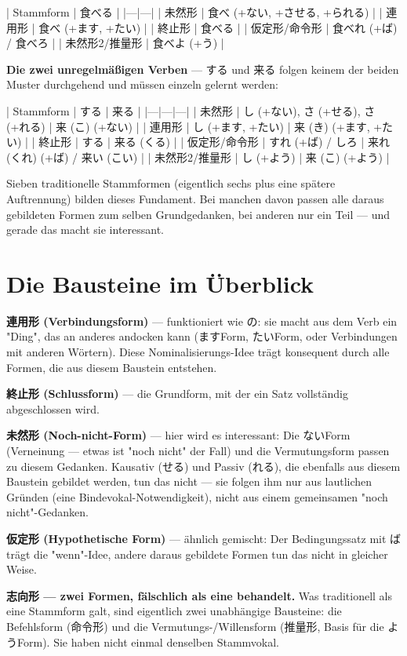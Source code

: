 \documentclass[12pt]{book}
\begin{document}
| Stammform | 食べる |
|---|---|
| 未然形 | 食べ (+ない, +させる, +られる) |
| 連用形 | 食べ (+ます, +たい) |
| 終止形 | 食べる |
| 仮定形/命令形 | 食べれ (+ば) / 食べろ |
| 未然形2/推量形 | 食べよ (+う) |

\textbf{Die zwei unregelmäßigen Verben} — する und 来る folgen keinem der beiden Muster durchgehend und müssen einzeln gelernt werden:

| Stammform | する | 来る |
|---|---|---|
| 未然形 | し (+ない), さ (+せる), さ (+れる) | 来 (こ) (+ない) |
| 連用形 | し (+ます, +たい) | 来 (き) (+ます, +たい) |
| 終止形 | する | 来る (くる) |
| 仮定形/命令形 | すれ (+ば) / しろ | 来れ (くれ) (+ば) / 来い (こい) |
| 未然形2/推量形 | し (+よう) | 来 (こ) (+よう) |

Sieben traditionelle Stammformen (eigentlich sechs plus eine spätere Auftrennung) bilden dieses Fundament. Bei manchen davon passen alle daraus gebildeten Formen zum selben Grundgedanken, bei anderen nur ein Teil — und gerade das macht sie interessant.

\section*{Die Bausteine im Überblick}

\textbf{連用形 (Verbindungsform)} — funktioniert wie の: sie macht aus dem Verb ein "Ding", das an anderes andocken kann (ますForm, たいForm, oder Verbindungen mit anderen Wörtern). Diese Nominalisierungs-Idee trägt konsequent durch alle Formen, die aus diesem Baustein entstehen.

\textbf{終止形 (Schlussform)} — die Grundform, mit der ein Satz vollständig abgeschlossen wird.

\textbf{未然形 (Noch-nicht-Form)} — hier wird es interessant: Die ないForm (Verneinung — etwas ist "noch nicht" der Fall) und die Vermutungsform passen zu diesem Gedanken. Kausativ (せる) und Passiv (れる), die ebenfalls aus diesem Baustein gebildet werden, tun das nicht — sie folgen ihm nur aus lautlichen Gründen (eine Bindevokal-Notwendigkeit), nicht aus einem gemeinsamen "noch nicht"-Gedanken.

\textbf{仮定形 (Hypothetische Form)} — ähnlich gemischt: Der Bedingungssatz mit ば trägt die "wenn"-Idee, andere daraus gebildete Formen tun das nicht in gleicher Weise.

\textbf{志向形 — zwei Formen, fälschlich als eine behandelt.} Was traditionell als eine Stammform galt, sind eigentlich zwei unabhängige Bausteine: die Befehlsform (命令形) und die Vermutungs-/Willensform (推量形, Basis für die ようForm). Sie haben nicht einmal denselben Stammvokal.
\end{document}

